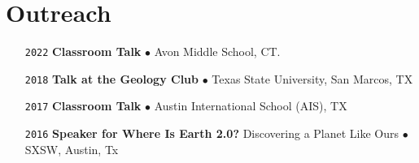 \section*{Outreach}

\begin{itemize}[leftmargin=3.8em, labelsep=1.5em]
    \setlength\itemsep{-.5em}
    \item[\texttt{2022}] 
    \textbf{Classroom Talk} $\bullet$ Avon Middle School, CT.
    \item[\texttt{2018}] \textbf{Talk at the Geology Club} $\bullet$ Texas State University, San Marcos, TX
    \item[\texttt{2017}] \textbf{Classroom Talk} $\bullet$ Austin International School (AIS), TX
    \item[\texttt{2016}] \textbf{Speaker for Where Is Earth 2.0?} Discovering a Planet Like Ours $\bullet$ SXSW, Austin, Tx
\end{itemize}